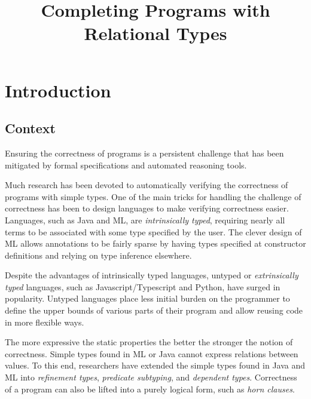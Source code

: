 \documentclass[sigplan,screen,review]{acmart}
\title{Completing Programs with Relational Types}
\begin{document}
\newcommand{\code}[1]{\texttt{#1}}
\newcommand{\claim}{\ \vdash\ }
\newcommand{\hastype}{\ \ddagger\ }
\newcommand{\subtypes}{\ \sqsubseteq\ }
\newcommand{\I}{\hspace{4mm}}
\newcommand{\B}[1]{\textbf{#1}}
\newcommand{\F}[1]{\text{#1}}
\newcommand{\bigand}{\bigwedge\nolimits}
\newcommand{\C}[1]{\color{teal} \rhd\ \emph{#1}}
\newcommand{\FIG}[1]{Fig. {\color{red} \ref{#1}}}
\newcommand{\TODO}[1]{\noindent \textbf{\color{red} TODO: #1}}
     



\maketitle


\section{Introduction}

\subsection{Context}
Ensuring the correctness of programs is a persistent challenge that has been 
mitigated by formal specifications and automated reasoning tools. 

Much research has been devoted to automatically verifying the correctness of programs with simple types.
One of the main tricks for handling the challenge of correctness has been
to design languages to make verifying correctness easier. Languages, such as Java and ML, 
are \textit{intrinsically typed}, 
requiring nearly all terms to be associated with some type specified by the user. 
The clever design of ML allows annotations to be fairly sparse by 
having types specified at constructor definitions and relying on type inference elsewhere.

Despite the advantages of intrinsically typed languages,
untyped or \textit{extrinsically typed} languages, 
such as Javascript/Typescript and Python, have surged in popularity. 
Untyped languages place less initial burden on the programmer to define the upper bounds  
of various parts of their program and allow reusing code in more flexible ways. 

The more expressive the static properties the better the stronger the notion of correctness. 
Simple types found in ML or Java cannot express relations between values.
To this end, researchers have extended the simple types found in Java and ML into 
\textit{refinement types}, \textit{predicate subtyping}, and \textit{dependent types}. 
Correctness of a program can also be lifted into a purely logical form, such as \textit{horn clauses}. 
\end{document}
